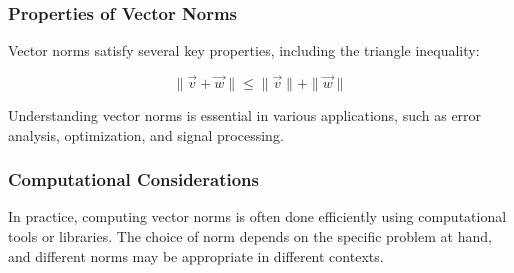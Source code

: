 \subsubsection{Properties of Vector Norms}

Vector norms satisfy several key properties, including the triangle inequality:

\[
\|\vec{v} + \vec{w}\| \leq \|\vec{v}\| + \|\vec{w}\|
\]

Understanding vector norms is essential in various applications, such as error analysis, optimization, and signal processing.

\subsubsection{Computational Considerations}

In practice, computing vector norms is often done efficiently using computational tools or libraries. The choice of norm depends on the specific problem at hand, and different norms may be appropriate in different contexts.
\fi

\newcommand{\matrixA}{%
$\begin{bNiceMatrix}
t_{1,1,1}  & & \Cdots        &t_{1,1,n}\\
\Vdots      &\Ddots     &               &\Vdots \\
            &           &                        \\
t_{1,m,1}  & &  \Cdots       & t_{1,m,n}\\
    \end{bNiceMatrix}$
}   

\newcommand{\matrixI}{%
    $\begin{bNiceMatrix}
    t_{i,1,1}  & & \Cdots        &t_{i,1,n}\\
    \Vdots      &\Ddots     &               &\Vdots \\
    &           &                           &\\
    t_{i,m,1}  & \Cdots&               & t_{i,m,n}\\
    \end{bNiceMatrix}$
}

